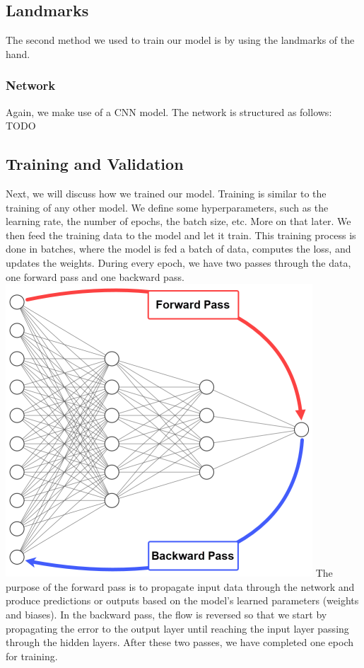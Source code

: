 \documentclass[../paper.tex]{subfiles}
\begin{document}
    \subsection{Landmarks}
    The second method we used to train our model is by using the landmarks of the hand.
    \subsubsection{Network}
    Again, we make use of a CNN model.
    The network is structured as follows:\\
    TODO

    \subsection{Training and Validation}
    Next, we will discuss how we trained our model.
    Training is similar to the training of any other model.
    We define some hyperparameters, such as the learning rate, the number of epochs, the batch size, etc.
    More on that later.
    We then feed the training data to the model and let it train.
    This training process is done in batches, where the model is fed a batch of data, computes the loss, and updates the weights.
    During every epoch, we have two passes through the data, one forward pass and one backward pass. 
    \includegraphics[width=\linewidth]{Backpropagation-passes-architecture}
    The purpose of the forward pass is to propagate input data through the network and produce predictions or outputs based on the model's learned parameters (weights and biases).\cite{o13}
    In the backward pass, the flow is reversed so that we start by propagating the error to the output layer until reaching the input layer passing through the hidden layers.\cite{o14}
    After these two passes, we have completed one epoch for training.
\end{document}
